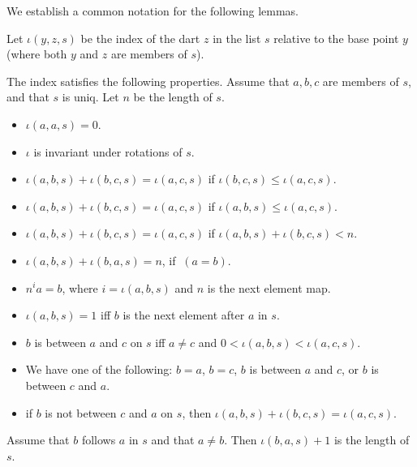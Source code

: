 
We establish a common notation for the following lemmas.

Let $\iota(y,z,s)$ be the index of the dart $z$ in the list $s$ relative
to the base point $y$ (where both $y$ and $z$ are members of $s$).

\begin{lemma}
The index satisfies the following properties.  Assume
that $a,b,c$ are members of $s$, and that $s$ is uniq.  Let $n$ be the length of $s$.
\begin{itemize}
\item $\iota(a,a,s)=0$.
\item $\iota$ is invariant under rotations of $s$.
\item $\iota(a,b,s) + \iota(b,c,s) = \iota(a,c,s)$ if $\iota(b,c,s)\le \iota(a,c,s)$.
\item $\iota(a,b,s) + \iota(b,c,s) = \iota(a,c,s)$ if $\iota(a,b,s)\le \iota(a,c,s)$.
\item $\iota(a,b,s) + \iota(b,c,s) = \iota(a,c,s)$ if $\iota(a,b,s)+\iota(b,c,s) < n$.
\item $\iota(a,b,s) + \iota(b,a,s) = n$, if $~(a=b)$.
\item $n^i a = b$, where $i=\iota(a,b,s)$ and $n$ is the next element map.
\item $\iota(a,b,s)=1$ iff $b$ is the next element after $a$ in $s$.
\item $b$ is between $a$ and $c$ on $s$ iff $a\ne c$ and $0 < \iota(a,b,s) < \iota(a,c,s)$.
\item We have one of the following: $b=a$, $b=c$, $b$ is between $a$ and $c$, or $b$ is between $c$ and $a$.
\item if $b$ is not between $c$ and $a$ on $s$, then $\iota(a,b,s) + \iota(b,c,s) = \iota(a,c,s)$.
\end{itemize}
\end{lemma}

\begin{lemma}
   Assume that $b$ follows $a$ in $s$ and that $a\ne b$. Then
$\iota(b,a,s) + 1$ is the length of $s$.
\end{lemma}

